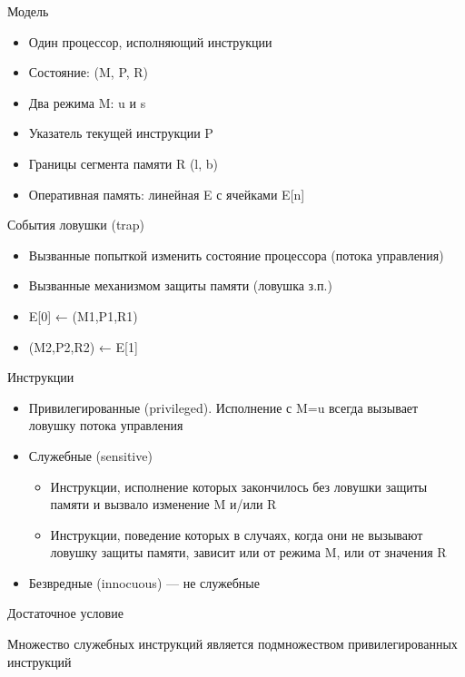 \documentclass{beamer}
\begin{document}
\begin{frame}{Модель}

\begin{itemize}
\item Один процессор, исполняющий инструкции
\item Состояние: (M, P, R)
\item Два режима M: u и s
\item Указатель текущей инструкции P
\item Границы сегмента памяти R (l, b)
\item Оперативная память: линейная E с ячейками E[n]
\end{itemize}

\end{frame}

\begin{frame}{События ловушки (trap)}
\begin{itemize}
\item Вызванные попыткой изменить состояние
процессора (потока управления)
\item Вызванные механизмом защиты памяти (ловушка з.п.)

\item E[0] ← (M1,P1,R1)
\item (M2,P2,R2) ← E[1]
\end{itemize}

\end{frame}

\begin{frame}{Инструкции}
\begin{itemize}
    \item Привилегированные (privileged). Исполнение с M=u всегда вызывает ловушку потока управления
    \item Служебные (sensitive)
    \begin{itemize}
        \item Инструкции, исполнение которых закончилось без ловушки защиты памяти и вызвало изменение M и/или R
        \item Инструкции, поведение которых в случаях, когда они не вызывают ловушку защиты памяти, зависит или от режима M, или от значения R
    \end{itemize}
    \item Безвредные (innocuous) — не служебные
\end{itemize}
\end{frame}

\begin{frame}[shrink=20]{Достаточное условие}

Множество служебных инструкций является подмножеством привилегированных инструкций

\centering
 
\end{frame}
\end{document}
